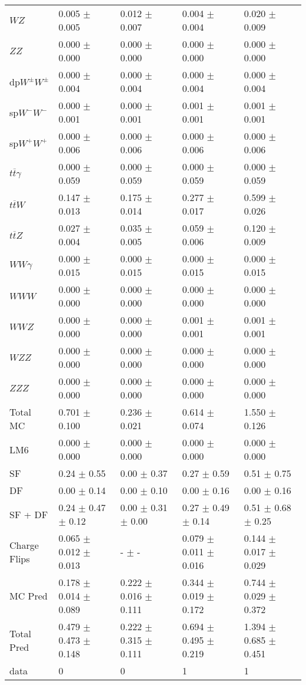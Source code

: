 \begin{tabular}{l | l l l l}
$WZ$ &  0.005 $\pm$  0.005 &  0.012 $\pm$  0.007 &  0.004 $\pm$  0.004 &  0.020 $\pm$  0.009\\
$ZZ$ &  0.000 $\pm$   0.000 &  0.000 $\pm$   0.000 &   0.000 $\pm$   0.000 &   0.000 $\pm$   0.000\\
\hline
dp$W^{\pm}W^{\pm}$ &  0.000 $\pm$  0.004 &  0.000 $\pm$  0.004 &  0.000 $\pm$  0.004 &  0.000 $\pm$  0.004\\
sp$W^{-}W^{-}$ &  0.000 $\pm$  0.001 &  0.000 $\pm$  0.001 &  0.001 $\pm$  0.001 &  0.001 $\pm$  0.001\\
sp$W^{+}W^{+}$ &  0.000 $\pm$  0.006 &  0.000 $\pm$  0.006 &  0.000 $\pm$  0.006 &  0.000 $\pm$  0.006\\
$t\overline{t}\gamma$ &  0.000 $\pm$  0.059 &  0.000 $\pm$  0.059 &  0.000 $\pm$  0.059 &  0.000 $\pm$  0.059\\
$t\overline{t}W$ &  0.147 $\pm$  0.013 &  0.175 $\pm$  0.014 &  0.277 $\pm$  0.017 &  0.599 $\pm$  0.026\\
$t\overline{t}Z$ &  0.027 $\pm$  0.004 &  0.035 $\pm$  0.005 &  0.059 $\pm$  0.006 &  0.120 $\pm$  0.009\\
$WW\gamma$ &  0.000 $\pm$  0.015 &  0.000 $\pm$  0.015 &  0.000 $\pm$  0.015 &  0.000 $\pm$  0.015\\
$WWW$ &  0.000 $\pm$   0.000 &   0.000 $\pm$   0.000 &   0.000 $\pm$   0.000 &   0.000 $\pm$   0.000\\
$WWZ$ &  0.000 $\pm$   0.000 &  0.000 $\pm$   0.000 &  0.001 $\pm$  0.001 &  0.001 $\pm$  0.001\\
$WZZ$ &   0.000 $\pm$   0.000 &   0.000 $\pm$   0.000 &  0.000 $\pm$   0.000 &   0.000 $\pm$   0.000\\
$ZZZ$ &   0.000 $\pm$   0.000 &  0.000 $\pm$   0.000 &   0.000 $\pm$   0.000 &   0.000 $\pm$   0.000\\
\hline
Total MC &  0.701 $\pm$  0.100 &  0.236 $\pm$  0.021 &  0.614 $\pm$  0.074 &  1.550 $\pm$  0.126\\
\hline\hline
\hline
LM6 &  0.000 $\pm$  0.000 &  0.000 $\pm$  0.000 &  0.000 $\pm$  0.000 &  0.000 $\pm$  0.000\\
\hline\hline
\hline\hline
 SF  & 0.24 $\pm$ 0.55 & 0.00 $\pm$ 0.37 & 0.27 $\pm$ 0.59 & 0.51 $\pm$ 0.75\\
 DF  & 0.00 $\pm$ 0.14 & 0.00 $\pm$ 0.10 & 0.00 $\pm$ 0.16 & 0.00 $\pm$ 0.16\\
\hline
 SF + DF  & 0.24 $\pm$ 0.47 $\pm$ 0.12 & 0.00 $\pm$ 0.31 $\pm$ 0.00 & 0.27 $\pm$ 0.49 $\pm$ 0.14 & 0.51 $\pm$ 0.68 $\pm$ 0.25\\
\hline\hline
Charge Flips & 0.065 $\pm$ 0.012 $\pm$ 0.013 & - $\pm$ - & 0.079 $\pm$ 0.011 $\pm$ 0.016 & 0.144 $\pm$ 0.017 $\pm$ 0.029\\
\hline\hline
\hline
MC Pred &  0.178 $\pm$  0.014 $\pm$  0.089 &  0.222 $\pm$  0.016 $\pm$  0.111 &  0.344 $\pm$  0.019 $\pm$  0.172 &  0.744 $\pm$  0.029 $\pm$  0.372\\
\hline\hline
Total Pred &  0.479 $\pm$  0.473 $\pm$  0.148 &  0.222 $\pm$  0.315 $\pm$  0.111 &  0.694 $\pm$  0.495 $\pm$  0.219 &  1.394 $\pm$  0.685 $\pm$  0.451\\
\hline\hline
data & 0 & 0 & 1 & 1\\
\hline\hline
\end{tabular}
